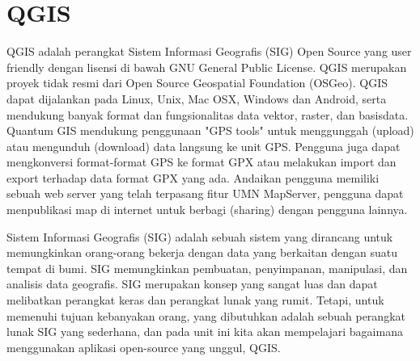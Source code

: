 \section{QGIS}
QGIS adalah perangkat Sistem Informasi Geografis (SIG) Open Source yang user friendly dengan lisensi di bawah GNU General Public License. QGIS merupakan proyek tidak resmi dari Open Source Geospatial Foundation (OSGeo). QGIS dapat dijalankan pada Linux, Unix, Mac OSX, Windows dan Android, serta mendukung banyak format dan fungsionalitas data vektor, raster, dan basisdata.
Quantum GIS mendukung penggunaan "GPS tools" untuk menggunggah (upload) atau mengunduh (download) data langsung ke unit GPS. Pengguna juga dapat mengkonversi format-format GPS ke format GPX atau melakukan import dan export terhadap data format GPX yang ada.
Andaikan pengguna memiliki sebuah web server yang telah terpasang fitur UMN MapServer, pengguna dapat menpublikasi map di internet untuk berbagi (sharing) dengan pengguna lainnya.

Sistem Informasi Geografis (SIG) adalah sebuah sistem yang dirancang untuk memungkinkan orang-orang bekerja dengan data yang berkaitan dengan suatu tempat di bumi. SIG memungkinkan pembuatan, penyimpanan, manipulasi, dan analisis data geografis. SIG merupakan konsep yang sangat luas dan dapat melibatkan perangkat keras dan perangkat lunak yang rumit. Tetapi, untuk memenuhi tujuan kebanyakan orang, yang dibutuhkan adalah sebuah perangkat lunak SIG yang sederhana, dan pada unit ini kita akan mempelajari bagaimana menggunakan aplikasi open-source yang unggul, QGIS.


